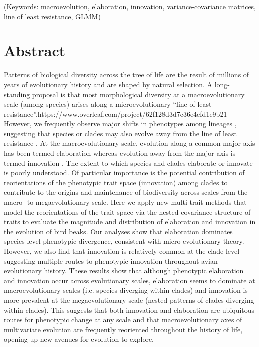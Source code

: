 \documentclass[12pt,letterpaper]{article}
\begin{document}
\noindent (Keywords: macroevolution, elaboration, innovation, variance-covariance matrices, line of least resistance, GLMM)\\

\section{Abstract}

Patterns of biological diversity across the tree of life are the result of millions of years of evolutionary history and are shaped by natural selection.
A long-standing proposal is that most morphological diversity at a macroevolutionary scale (among species) arises along a microevolutionary ``line of least resistance''.https://www.overleaf.com/project/62f128d3d7c36e4efd1e9b21
However, we frequently observe major shifts in phenotypes among lineages \cite{venditti2011multiple, pagel2022general, BurinWhales}, suggesting that species or clades may also evolve away from the line of least resistance \cite{renaud2006conserved}.
At the macroevolutionary scale, evolution along a common major axis has been termed elaboration whereas evolution away from the major axis is termed innovation \cite{endler2005animal}. 
The extent to which species and clades elaborate or innovate is poorly understood.
Of particular importance is the potential contribution of reorientations of the phenotypic trait space (innovation) among clades to contribute to the origins and maintenance of biodiversity across scales from the macro- to megaevolutionary scale.
Here we apply new multi-trait methods that model the reorientations of the trait space via the nested covariance structure of traits to evaluate the magnitude and distribution of elaboration and innovation in the evolution of bird beaks.
Our analyses show that elaboration dominates species-level phenotypic divergence, consistent with micro-evolutionary theory.
However, we also find that innovation is relatively common at the clade-level suggesting multiple routes to phenotypic innovation throughout avian evolutionary history.
These results show that although phenotypic elaboration and innovation occur across evolutionary scales, elaboration seems to dominate at macroevolutionary scales (i.e. species diverging within clades) and innovation is more prevalent at the megaevolutionary scale (nested patterns of clades diverging within clades).
This suggests that both innovation and elaboration are ubiquitous routes for phenotypic change at any scale and that macroevolutionary axes of multivariate evolution are frequently reoriented throughout the history of life, opening up new avenues for evolution to explore.
\end{document}
